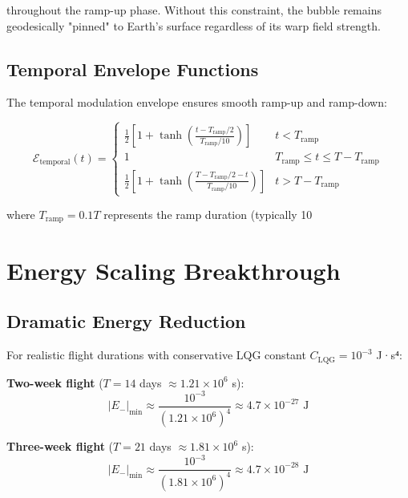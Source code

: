 \documentclass[12pt,a4paper]{article}
\begin{document}
throughout the ramp-up phase. Without this constraint, the bubble remains geodesically "pinned" to Earth's surface regardless of its warp field strength.

\subsection{Temporal Envelope Functions}

The temporal modulation envelope ensures smooth ramp-up and ramp-down:

\begin{equation}
\mathcal{E}_{\text{temporal}}(t) = \begin{cases}
\frac{1}{2}\left[1 + \tanh\left(\frac{t - T_{\text{ramp}}/2}{T_{\text{ramp}}/10}\right)\right] & t < T_{\text{ramp}} \\
1 & T_{\text{ramp}} \leq t \leq T - T_{\text{ramp}} \\
\frac{1}{2}\left[1 + \tanh\left(\frac{T - T_{\text{ramp}}/2 - t}{T_{\text{ramp}}/10}\right)\right] & t > T - T_{\text{ramp}}
\end{cases}
\end{equation}

where $T_{\text{ramp}} = 0.1T$ represents the ramp duration (typically 10%

\section{Energy Scaling Breakthrough}

\subsection{Dramatic Energy Reduction}

For realistic flight durations with conservative LQG constant $C_{\text{LQG}} = 10^{-3}$ J·s⁴:

\textbf{Two-week flight} ($T = 14$ days $\approx 1.21 \times 10^6$ s):
\begin{equation}
|E_-|_{\min} \approx \frac{10^{-3}}{(1.21 \times 10^6)^4} \approx 4.7 \times 10^{-27} \text{ J}
\end{equation}

\textbf{Three-week flight} ($T = 21$ days $\approx 1.81 \times 10^6$ s):
\begin{equation}
|E_-|_{\min} \approx \frac{10^{-3}}{(1.81 \times 10^6)^4} \approx 4.7 \times 10^{-28} \text{ J}
\end{equation}
\end{document}
